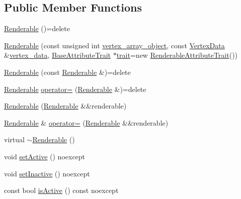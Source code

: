 \subsection*{Public Member Functions}
\begin{DoxyCompactItemize}
\item 
\hyperlink{class_graphics_1_1_renderable_a2c99d41631558194811f6f4c61a7f464}{Renderable} ()=delete
\item 
\hyperlink{class_graphics_1_1_renderable_a08ba323265fd34d219ed3495ee255c9b}{Renderable} (const unsigned int \hyperlink{class_graphics_1_1_renderable_aabfa91ebff7b10decd54119d663044ef}{vertex\+\_\+array\+\_\+object}, const \hyperlink{class_graphics_1_1_vertex_data}{Vertex\+Data} \&\hyperlink{class_graphics_1_1_renderable_a5077fe6a71021f0bd4ebc8d24cdf544b}{vertex\+\_\+data}, \hyperlink{class_graphics_1_1_base_attribute_trait}{Base\+Attribute\+Trait} $\ast$\hyperlink{class_graphics_1_1_renderable_a27f39fbb4866ccfc83f0662a59c03020}{trait}=new \hyperlink{class_graphics_1_1_renderable_attribute_trait}{Renderable\+Attribute\+Trait}())
\item 
\hyperlink{class_graphics_1_1_renderable_a7db48c39efa99650480cca6376bbf6c6}{Renderable} (const \hyperlink{class_graphics_1_1_renderable}{Renderable} \&)=delete
\item 
\hyperlink{class_graphics_1_1_renderable}{Renderable} \hyperlink{class_graphics_1_1_renderable_aa96e579c501d01462f5ee2ed5e949311}{operator=} (\hyperlink{class_graphics_1_1_renderable}{Renderable} \&)=delete
\item 
\hyperlink{class_graphics_1_1_renderable_a7edf9a0c89593ab500d5107e89f7bbae}{Renderable} (\hyperlink{class_graphics_1_1_renderable}{Renderable} \&\&renderable)
\item 
\hyperlink{class_graphics_1_1_renderable}{Renderable} \& \hyperlink{class_graphics_1_1_renderable_afac6ce4fffafffef11300fd13b763ef4}{operator=} (\hyperlink{class_graphics_1_1_renderable}{Renderable} \&\&renderable)
\item 
virtual \hyperlink{class_graphics_1_1_renderable_a63470b6e63ed9f87690569833fb48617}{$\sim$\+Renderable} ()
\item 
void \hyperlink{class_graphics_1_1_renderable_aab2e51991d63780654d7cc8a7083faca}{set\+Active} () noexcept
\item 
void \hyperlink{class_graphics_1_1_renderable_a9b6b9bf46beb9e4df9a0ba1dae55b87e}{set\+Inactive} () noexcept
\item 
const bool \hyperlink{class_graphics_1_1_renderable_a3ee6ae0274eaed19b731a97c5b44d2d6}{is\+Active} () const noexcept

\end{DoxyCompactItemize}
